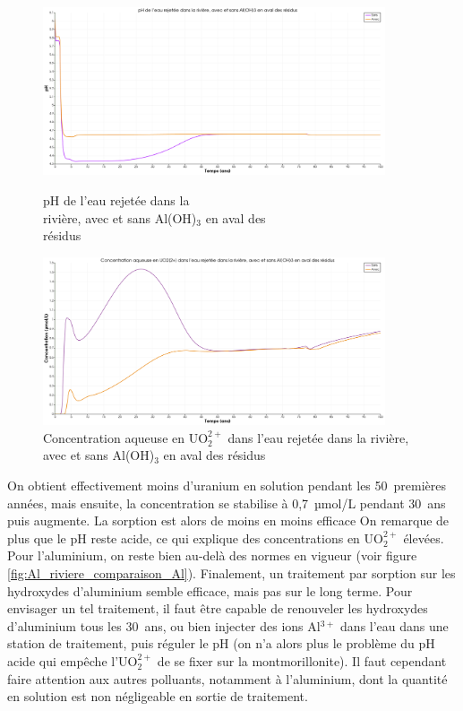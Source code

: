 \documentclass{article}
\begin{document}
\begin{figure}[H]
    \centering
    \begin{minipage}{0.5\textwidth}
        \centering
        \includegraphics[width=0.9\textwidth]{III_B_2_22.png} 
        \caption{pH de l'eau rejetée dans la \\rivière, avec et sans Al(OH)$_3$ en aval des \\résidus}
        \label{fig:pH_riviere_comparaison_Al}
    \end{minipage}\hfill
    \begin{minipage}{0.5\textwidth}
        \centering
        \includegraphics[width=0.9\textwidth]{III_B_2_23.png} 
        \caption{Concentration aqueuse en UO$_2^{2+}$ dans l'eau rejetée dans la rivière, avec et sans Al(OH)$_3$ en aval des résidus}
        \label{fig:UO2_riviere_comparaison_Al}
    \end{minipage}
\end{figure}



On obtient effectivement moins d’uranium en solution pendant les 50~premières années, mais ensuite, la concentration se stabilise à 0,7~µmol/L pendant 30~ans puis augmente. La sorption est alors de moins en moins efficace On remarque de plus que le pH reste acide, ce qui explique des concentrations en UO$_2^{2+}$ élevées. Pour l’aluminium, on reste bien au-delà des normes en vigueur (voir figure \ref{fig:Al_riviere_comparaison_Al}).
Finalement, un traitement par sorption sur les hydroxydes d’aluminium semble efficace, mais pas sur le long terme. Pour envisager un tel traitement, il faut être capable de renouveler les hydroxydes d’aluminium tous les 30~ans, ou bien injecter des ions Al$^{3+}$ dans l’eau dans une station de traitement, puis réguler le pH (on n’a alors plus le problème du pH acide qui empêche l’UO$_2^{2+}$ de se fixer sur la montmorillonite). Il faut cependant faire attention aux autres polluants, notamment à l’aluminium, dont la quantité en solution est non négligeable en sortie de traitement.
\end{document}

